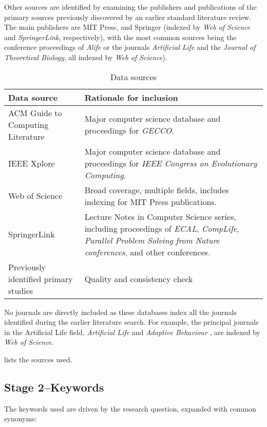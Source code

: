 Other sources are identified by examining the publishers and publications of the primary sources previously discovered by an earlier standard literature review. The main publishers are MIT Press, and Springer (indexed by \emph{Web of Science} and \emph{SpringerLink}, respectively), with the most common sources being the conference proceedings of \emph{Alife} or the journals \emph{Artificial Life} and the \emph{Journal of Theoretical Biology}, all indexed by \emph{Web of Science}).

\begin{table}
\footnotesize
\begin{center}
\begin{tabular}{@{}p{4cm}p{9cm}@{}}
\toprule
Data source & Rationale for inclusion\\
\midrule
ACM Guide to Computing Literature & Major computer science database and proceedings for \textit{GECCO}.\\
IEEE Xplore & Major computer science database and proceedings for \textit{IEEE Congress on Evolutionary Computing}.\\
Web of Science & Broad coverage, multiple fields, includes indexing for MIT Press publications.\\
SpringerLink & Lecture Notes in Computer Science series, including proceedings of \textit{ECAL}, \textit{CompLife}, \textit{Parallel Problem Solving from Nature conferences}, and other conferences.\\
Previously identified primary studies & Quality and consistency check\\
\bottomrule
\end{tabular}
\end{center}
\caption{Data sources}\label{map-data-sources}
\end{table}

No journals are directly included as these databases index all the journals identified during the earlier literature search. For example, the principal journals in the Artificial Life field, \emph{Artificial Life} and \emph{Adaptive Behaviour} \parencite{Aicardi2010}, are indexed by \textit{Web of Science}.

 lists the sources used.

\subsection{Stage 2--Keywords}

The keywords used are driven by the research question, expanded with common synonyms:

